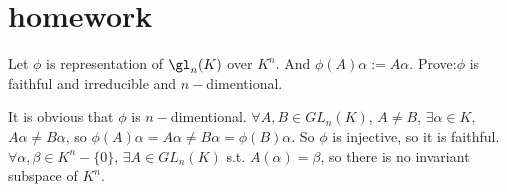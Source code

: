 \documentclass{ctexart}
\newif\ifpreface
\begin{document}
\large
\setlength{\baselineskip}{1.2em}
\ifpreface
    
    \newgeometry{left=2cm,right=2cm,top=2cm,bottom=2cm}
\else
{}
\maketitle
\fi

\section{homework}
\begin{problem}\label{pro:1}
    Let $\phi$ is representation of $\gl_n(K)$ over $K^n$. And $\phi(A)\alpha:=A \alpha$. Prove:$\phi$ is faithful and irreducible and $n-$dimentional. 
\end{problem}

\begin{solution}
    It is obvious that $\phi$ is $n-$dimentional. $\forall A,B\in GL_n(K)$, $A\neq B$, $\exists \alpha\in K$, $A \alpha\neq B \alpha$, so $\phi(A) \alpha=A \alpha\neq B \alpha=\phi (B) \alpha$. So $\phi$ is injective, so it is faithful. $\forall \alpha , \beta\in K^n\minus\{0\}$, $\exists A\in GL_n(K)$ s.t. $A(\alpha)=\beta$, so there is no invariant subspace of $K^n$.
\end{solution}
\end{document}
